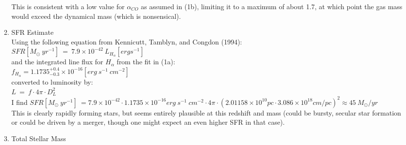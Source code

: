 \documentclass[11pt]{article}
\begin{document}
\begin{enumerate}
\begin{enumerate}
	 This is consistent with a low value for $\alpha_{CO}$ as assumed in (1b), limiting it to a maximum of about 1.7, at which point the gas mass would exceed the dynamical mass (which is nonsensical).\\
	 
	 
	 
	 
	 
	 \item SFR Estimate %
	 \\
	 Using the following equation from Kennicutt, Tamblyn, and Congdon (1994):\\
	 
	 \hspace{10mm} $SFR [M_{\odot}\ yr^{-1}]\ =\ 7.9 \times 10^{-42}\ L_{H_{\alpha}} [erg s^{-1}]$\\
	 
	 and the integrated line flux for $H_{\alpha}$ from the fit in (1a):\\
		 
	 \hspace{10mm} $f_{H_{\alpha}} = 1.1735^{+0.4}_{-0.3} \times 10^{-16} [erg\ s^{-1}\ cm^{-2}]$\\
	 
	 converted to luminosity by:\\
	 
	  \hspace{10mm} $L\ =\ f \cdot 4\pi \cdot D^{2}_{L}$\\
	  
	  
	  I find $SFR [M_{\odot}\ yr^{-1}]\ = 7.9 \times 10^{-42} \cdot 1.1735 \times 10^{-16} erg\ s^{-1}\ cm^{-2} \cdot 4\pi \cdot (2.01158 \times 10^{10} pc \cdot 3.086 \times 10 ^{18} cm/pc)^2 \approx 45\ M_{\odot}/yr$ \\
	  
	  This is clearly rapidly forming stars, but seems entirely plausible at this redshift and mass (could be bursty, secular star formation or could be driven by a merger, though one might expect an even higher SFR in that case).\\
	  
	  
	  
	  \item Total Stellar Mass
	  \\
	  
	 
	 
	 
	
 
   \end{enumerate}

\end{enumerate}
\end{document}
